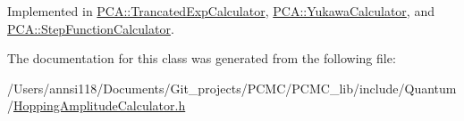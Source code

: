 Implemented in \hyperlink{class_p_c_a_1_1_trancated_exp_calculator_afe48461b23fd2b0d350f32bdac0c3d18}{P\+C\+A\+::\+Trancated\+Exp\+Calculator}, \hyperlink{class_p_c_a_1_1_yukawa_calculator_a543f237d55350a7669f8b85789cae68d}{P\+C\+A\+::\+Yukawa\+Calculator}, and \hyperlink{class_p_c_a_1_1_step_function_calculator_a0607e2f78b6b7c0ed40083f921b58fdc}{P\+C\+A\+::\+Step\+Function\+Calculator}.



The documentation for this class was generated from the following file\+:\begin{DoxyCompactItemize}
\item 
/\+Users/annsi118/\+Documents/\+Git\+\_\+projects/\+P\+C\+M\+C/\+P\+C\+M\+C\+\_\+lib/include/\+Quantum/\hyperlink{_hopping_amplitude_calculator_8h}{Hopping\+Amplitude\+Calculator.\+h}\end{DoxyCompactItemize}
